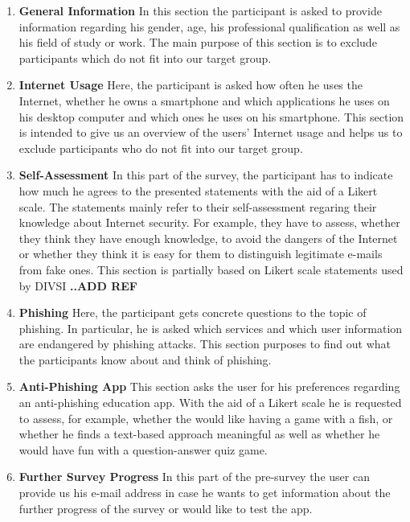 \begin{enumerate}
	\item \textbf{General Information} In this section the participant is asked to provide information regarding his gender, age, his professional qualification as well as his field of study or work.
 The main purpose of this section is to exclude participants which do not fit into our target group.

	\item \textbf{Internet Usage} Here, the participant is asked how often he uses the Internet, whether he owns a smartphone and which applications he uses on his desktop computer and which ones he uses on his smartphone.
 This section is intended to give us an overview of the users' Internet usage and helps us to exclude participants who do not fit into our target group.

	\item \textbf{Self-Assessment} In this part of the survey, the participant has to indicate how much he agrees to the presented statements with the aid of a Likert scale.
 The statements mainly refer to their self-assessment regaring their knowledge about Internet security.
 For example, they have to assess, whether they think they have enough knowledge, to avoid the dangers of the Internet or whether they think it is easy for them to distinguish legitimate e-mails from fake ones.
 This section is partially based on Likert scale statements used by DIVSI \textbf{..ADD REF}
	\item \textbf{Phishing} Here, the participant gets concrete questions to the topic of phishing.
 In particular, he is asked which services and which user information are endangered by phishing attacks.
 This section purposes to find out what the participants know about and think of phishing.

	\item \textbf{Anti-Phishing App} This section asks the user for his preferences regarding an anti-phishing education app.
 With the aid of a Likert scale he is requested to assess, for example, whether the would like having a game with a fish, or whether he finds a text-based approach meaningful as well as whether he would have fun with a question-answer quiz game.

	\item \textbf{Further Survey Progress} In this part of the pre-survey the user can provide us his e-mail address in case he wants to get information about the further progress of the survey or would like to test the app.

\end{enumerate}

